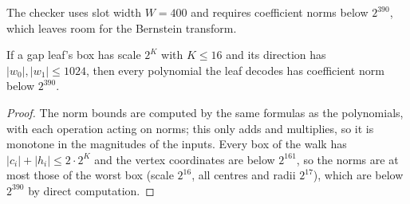 The checker uses slot width $W = 400$ and requires coefficient norms below $2^{390}$,
which leaves room for the Bernstein transform.

\begin{lemma}
\label{lem:norm_guard}
\leanok
{}
If a gap leaf's box has scale $2^K$ with $K \le 16$ and its direction has
$|w_0|, |w_1| \le 1024$, then every polynomial the leaf decodes has coefficient norm below
$2^{390}$.
\end{lemma}
\begin{proof}
\leanok
The norm bounds are computed by the same formulas as the polynomials, with each operation
acting on norms; this only adds and multiplies, so it is monotone in the magnitudes of the
inputs. Every box of the walk has $|c_i| + |h_i| \le 2 \cdot 2^K$ and the vertex coordinates
are below $2^{161}$, so the norms are at most those of the worst box (scale $2^{16}$, all centres
and radii $2^{17}$), which are below $2^{390}$ by direct computation.
\end{proof}
